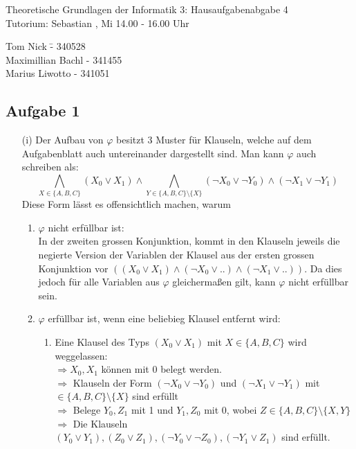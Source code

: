 \documentclass[a4paper,10pt]{article}
\begin{document}
\begin{center}
\Large{Theoretische Grundlagen der Informatik 3: Hausaufgabenabgabe 4} \\
\large{Tutorium: Sebastian , Mi 14.00 - 16.00 Uhr}
\end{center}
\begin{tabbing}
Tom Nick \hspace{2cm}\= - 340528\\
Maximillian Bachl \> - 341455 \\
Marius Liwotto\> -  341051
\end{tabbing}
	\subsection*{Aufgabe 1}
	\begin{enumerate}
	\item[(i)]
		Der Aufbau von \(\varphi\) besitzt 3 Muster für Klauseln, welche auf dem Aufgabenblatt auch untereinander dargestellt sind. Man kann \(\varphi \) auch schreiben als:
		\[ \bigwedge_{X \in \{A,B,C\}} (X_0 \lor X_1) \land \bigwedge_{Y \in \{A,B,C \}\setminus\{X\} }(\lnot X_0 \lor \lnot Y_0) \land (\lnot X_1 \lor \lnot Y_1) \]
		Diese Form lässt es offensichtlich machen, warum
		\begin{enumerate}[1.]
			\item $\varphi$ nicht erfüllbar ist: \\
				In der zweiten grossen Konjunktion, kommt in den Klauseln jeweils die negierte Version der Variablen der Klausel aus der ersten grossen Konjunktion vor $( (X_0 \lor X_1) \land (\lnot X_0 \lor ..) \land (\lnot X_1 \lor ..))$. Da dies jedoch für alle Variablen aus $\varphi$ gleichermaßen gilt, kann $\varphi$ nicht erfüllbar sein.
			\item $\varphi$ erfüllbar ist, wenn eine beliebieg Klausel entfernt wird:
				\begin{enumerate}
				\item Eine Klausel des Typs $(X_0 \lor X_1)$  mit $ X \in \{ A,B,C\}$ wird weggelassen: \\
				$\Rightarrow X_0,X_1$ können mit 0 belegt werden. \\
				$\Rightarrow $ Klauseln der Form $(\lnot X_0 \lor \lnot Y_0)$ und $(\lnot X_1 \lor \lnot Y_1)$ mit $ \in \{A,B,C \}\setminus\{X\}$  sind erfüllt\\
				$\Rightarrow$ Belege $Y_0,Z_1$ mit 1 und $Y_1,Z_0$ mit 0, wobei $Z \in \{A,B,C\}\setminus\{X,Y\}$ \\
				$\Rightarrow$ Die Klauseln $(Y_0 \lor Y_1),(Z_0 \lor Z_1),(\lnot Y_0 \lor \lnot Z_0), (\lnot Y_1 \lor Z_1)$ sind erfüllt.

\end{enumerate}
\end{enumerate}
\end{enumerate}
\end{document}
